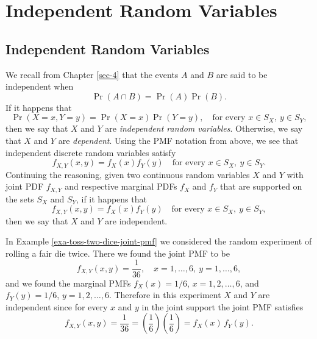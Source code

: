 \documentclass[captions=tableheading]{scrbook}
\begin{document}
\section{Independent Random Variables}
\label{sec-7-4}
\label{sec-Independent-Random-Variables}
\subsection{Independent Random Variables}
\label{sec-7-4-1}
\label{sub-Independent-Random-Variables}


We recall from Chapter \ref{sec-4} that the events \(A\) and \(B\) are said to be independent when
\begin{equation}
\Pr(A\cap B)=\Pr(A)\Pr(B).
\end{equation}
If it happens that
\begin{equation}
\Pr(X=x,Y=y)=\Pr(X=x)\Pr(Y=y),\quad\mbox{for every }x\in S_{X},\ y\in S_{Y},
\end{equation}
then we say that \(X\) and \(Y\) are \emph{independent random variables}. Otherwise, we say that \(X\) and \(Y\) are \emph{dependent}. Using the PMF notation from above, we see that independent discrete random variables satisfy
\begin{equation}
f_{X,Y}(x,y)=f_{X}(x)f_{Y}(y)\quad\mbox{for every }x\in S_{X},\ y\in S_{Y}.
\end{equation}
Continuing the reasoning, given two continuous random variables \(X\) and \(Y\) with joint PDF \(f_{X,Y}\) and respective marginal PDFs \(f_{X}\) and \(f_{Y}\) that are supported on the sets \(S_{X}\) and \(S_{Y}\), if it happens that
\begin{equation}
f_{X,Y}(x,y)=f_{X}(x)f_{Y}(y)\quad\mbox{for every }x\in S_{X},\ y\in S_{Y},
\end{equation}
then we say that \(X\) and \(Y\) are independent.

\begin{example}
In Example \ref{exa-toss-two-dice-joint-pmf} we considered the random experiment of rolling a fair die twice. There we found the joint PMF to be
\[
f_{X,Y}(x,y)=\frac{1}{36},\quad x=1,\ldots,6,\ y=1,\ldots,6,
\]
and we found the marginal PMFs \(f_{X}(x)=1/6\), \(x=1,2,\ldots,6\), and \(f_{Y}(y)=1/6\), \(y=1,2,\ldots,6\). Therefore in this experiment \(X\) and \(Y\) are independent since for every \(x\) and \(y\) in the joint support the joint PMF satisfies
\[
f_{X,Y}(x,y)=\frac{1}{36}=\left(\frac{1}{6}\right)\left(\frac{1}{6}\right)=f_{X}(x)\, f_{Y}(y).
\]
\end{example}
\end{document}
